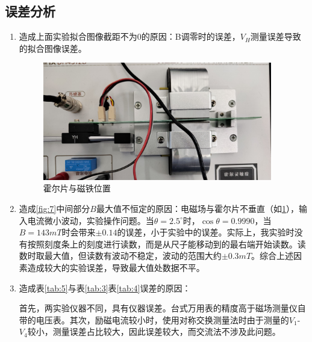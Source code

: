 \documentclass[11pt]{article}
\begin{document}
\subsection{误差分析}

\begin{enumerate}
    \item 造成上面实验拟合图像截距不为0的原因：B调零时的误差，$V_H$测量误差导致的拟合图像误差。
    \begin{figure}[!ht]
        \centering
        \includegraphics[width=10cm]{Fig/9.jpg}
        \caption{霍尔片与磁铁位置}
        \label{fig:9}
    \end{figure}
    \item 造成\cref{fig:7}中间部分$B$最大值不恒定的原因：电磁场与霍尔片不垂直（如\cref{fig:9}），输入电流微小波动，实验操作问题。当$\theta=2.5^\circ$时，$\cos \theta =0.9990$，当$B=143mT$时会带来$\pm0.14$的误差，小于实验中的误差。实际上，我实验时没有按照刻度条上的刻度进行读数，而是从尺子能移动到的最右端开始读数。读数时取最大值，但读数有波动不稳定，波动的范围大约$\pm 0.3mT$。综合上述因素造成较大的实验误差，导致最大值处数据不平。
    \item 造成表\ref{tab:5}与表\ref{tab:3}表\ref{tab:4}误差的原因：
    \par \hspace*{2em}首先，两实验仪器不同，具有仪器误差。台式万用表的精度高于磁场测量仪自带的电压表。其次，励磁电流较小时，使用对称交换测量法时由于测量的$V_1$-$V_4$较小，测量误差占比较大，因此误差较大，而交流法不涉及此问题。
\end{enumerate}
\end{document}
